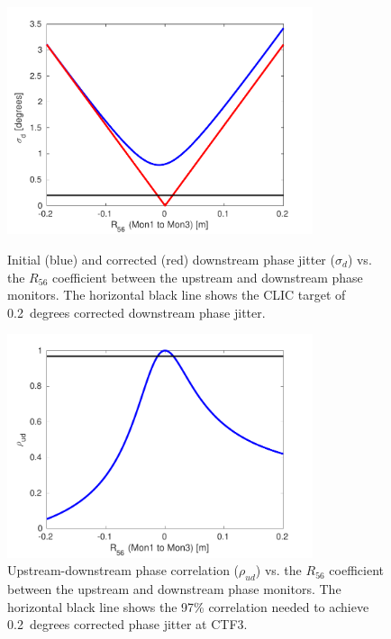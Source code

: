 \begin{figure}
  \centering
  \includegraphics[width=0.8\textwidth]{Figures/propagation/jitVsR56}
  \caption{Initial (blue) and corrected (red) downstream phase jitter (\(\sigma_d\)) vs. the \(R_{56}\) coefficient between the upstream and downstream phase monitors. The horizontal black line shows the CLIC target of 0.2~degrees corrected downstream phase jitter.}
  \label{f:jitVsR56}
  \includegraphics[width=0.8\textwidth]{Figures/propagation/corrVsR56}
  \caption{Upstream-downstream phase correlation (\(\rho_{ud}\)) vs. the \(R_{56}\) coefficient between the upstream and downstream phase monitors. The horizontal black line shows the 97\% correlation needed to achieve 0.2~degrees corrected phase jitter at CTF3.}
  \label{f:corrVsR56}
\end{figure}


